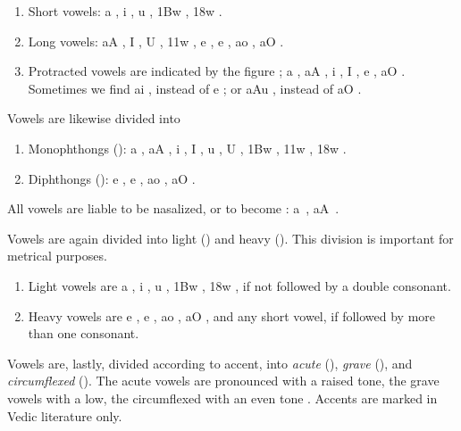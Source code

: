 \begin{enumerate}
\item Short vowels: {\dn a} , {\dn i} , {\dn u} , {\dn \31Bw} ,
  {\dn \318w} .
\item Long vowels: {\dn aA} , {\dn I} , {\dn U} , {\dn \311w}
  , {\dn e} , {\dn e\?} , {\dn ao} , {\dn aO} .
\item Protracted vowels are indicated by the figure {\dn {}} ; {\dn a}
  , {\dn aA} , {\dn i} , {\dn I} , {\dn e} ,
  {\dn aO} . Sometimes we find {\dn ai} , instead of {\dn e}
  ; or {\dn aAu} , instead of {\dn aO} .
\end{enumerate}

\s Vowels are likewise divided into

\begin{enumerate}
\item Monophthongs (): {\dn a} , {\dn aA} , {\dn i}
  , {\dn I} , {\dn u} , {\dn U} , {\dn \31Bw} , {\dn \311w}
  , {\dn \318w} .
\item Diphthongs (): {\dn e} , {\dn e\?} , {\dn ao}
  , {\dn aO} .
\end{enumerate}

\s All vowels are liable to be nasalized, or to become :
{\dn a\1}~, {\dn aA\1}~.

\s Vowels are again divided into light () and heavy
(). This division is important for metrical purposes.

\begin{enumerate}
\item Light vowels are {\dn a} , {\dn i} , {\dn u} , {\dn \31Bw} ,
  {\dn \318w} , if not followed by a double consonant.
\item Heavy vowels are {\dn e} , {\dn e\?} , {\dn ao} , {\dn aO}
  , and any short vowel, if followed by more than one consonant.
\end{enumerate}

\s Vowels are, lastly, divided according to accent, into \emph{acute}
(), \emph{grave} (), and \emph{circumflexed}
(). The acute vowels are pronounced with a raised tone, the
grave vowels with a low, the circumflexed with an even tone %
%
. Accents are marked in Vedic literature only.

